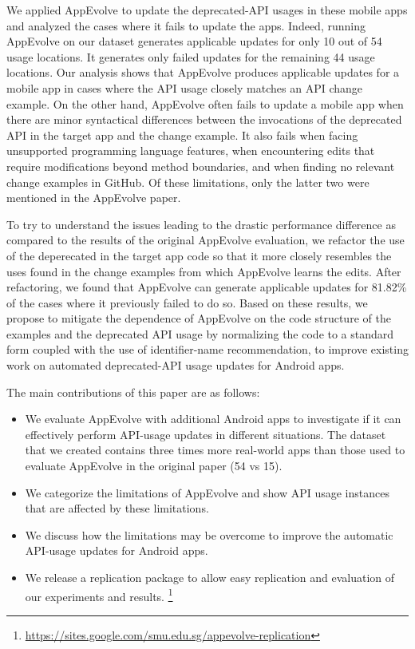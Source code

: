 We applied AppEvolve to update the deprecated-API usages in these mobile
apps and analyzed the cases where it fails to update the apps. Indeed,
running AppEvolve on our dataset generates applicable updates for only 10
out of 54 usage locations.  It generates only failed updates for the
remaining 44 usage locations. Our analysis shows that AppEvolve produces
applicable updates for a mobile app in cases where the API usage closely
matches an API change example.  On the other hand, AppEvolve often fails to
update a mobile app when there are minor syntactical differences between
the invocations of the deprecated API in the target app and the change
example.  It also fails when facing unsupported  programming language features, when encountering edits
that require modifications beyond method boundaries, and when finding no
relevant change examples in GitHub.  Of these limitations, only the latter
two were mentioned in the AppEvolve paper.

To try to understand the issues leading to the drastic performance
difference as compared to the results of the original AppEvolve evaluation,
we refactor the use of the deperecated in the target app code so that it
more closely resembles the uses found in the change examples from which
AppEvolve learns the edits.  After refactoring, we found that AppEvolve can
generate applicable updates for 81.82\% of the cases where it previously
failed to do so.  Based on these results, we propose to mitigate the
dependence of AppEvolve on the code structure of the examples and the
deprecated API usage by normalizing the code to a standard form coupled
with the use of identifier-name recommendation, to improve existing work on
automated deprecated-API usage updates for Android apps.

The main contributions of this paper are as follows:
\begin{itemize}
	\item We  evaluate AppEvolve with additional Android apps to investigate if it can effectively perform API-usage updates in different situations. The dataset that we created contains three times more real-world apps than those used to evaluate AppEvolve in the original paper (54 vs 15).
	\item We categorize the limitations of AppEvolve and show API usage
	instances that are affected by these limitations.
	\item We discuss how the limitations may be overcome to improve the automatic API-usage updates for Android apps.
	\item We release a replication package to allow easy replication
	and evaluation of our experiments and results. 
\footnote{\url{https://sites.google.com/smu.edu.sg/appevolve-replication}}
	 
\end{itemize}

